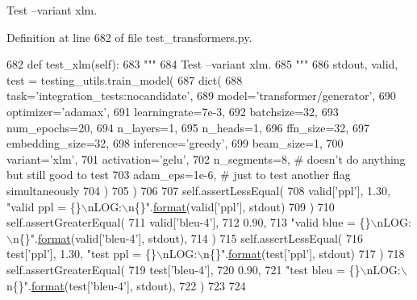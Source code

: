 \begin{DoxyVerb}Test --variant xlm.
\end{DoxyVerb}
 

Definition at line 682 of file test\+\_\+transformers.\+py.


\begin{DoxyCode}
682     \textcolor{keyword}{def }test\_xlm(self):
683         \textcolor{stringliteral}{"""}
684 \textcolor{stringliteral}{        Test --variant xlm.}
685 \textcolor{stringliteral}{        """}
686         stdout, valid, test = testing\_utils.train\_model(
687             dict(
688                 task=\textcolor{stringliteral}{'integration\_tests:nocandidate'},
689                 model=\textcolor{stringliteral}{'transformer/generator'},
690                 optimizer=\textcolor{stringliteral}{'adamax'},
691                 learningrate=7e-3,
692                 batchsize=32,
693                 num\_epochs=20,
694                 n\_layers=1,
695                 n\_heads=1,
696                 ffn\_size=32,
697                 embedding\_size=32,
698                 inference=\textcolor{stringliteral}{'greedy'},
699                 beam\_size=1,
700                 variant=\textcolor{stringliteral}{'xlm'},
701                 activation=\textcolor{stringliteral}{'gelu'},
702                 n\_segments=8,  \textcolor{comment}{# doesn't do anything but still good to test}
703                 adam\_eps=1e-6,  \textcolor{comment}{# just to test another flag simultaneously}
704             )
705         )
706 
707         self.assertLessEqual(
708             valid[\textcolor{stringliteral}{'ppl'}], 1.30, \textcolor{stringliteral}{"valid ppl = \{\}\(\backslash\)nLOG:\(\backslash\)n\{\}"}.\hyperlink{namespaceparlai_1_1chat__service_1_1services_1_1messenger_1_1shared__utils_a32e2e2022b824fbaf80c747160b52a76}{format}(valid[\textcolor{stringliteral}{'ppl'}], stdout)
709         )
710         self.assertGreaterEqual(
711             valid[\textcolor{stringliteral}{'bleu-4'}],
712             0.90,
713             \textcolor{stringliteral}{"valid blue = \{\}\(\backslash\)nLOG:\(\backslash\)n\{\}"}.\hyperlink{namespaceparlai_1_1chat__service_1_1services_1_1messenger_1_1shared__utils_a32e2e2022b824fbaf80c747160b52a76}{format}(valid[\textcolor{stringliteral}{'bleu-4'}], stdout),
714         )
715         self.assertLessEqual(
716             test[\textcolor{stringliteral}{'ppl'}], 1.30, \textcolor{stringliteral}{"test ppl = \{\}\(\backslash\)nLOG:\(\backslash\)n\{\}"}.\hyperlink{namespaceparlai_1_1chat__service_1_1services_1_1messenger_1_1shared__utils_a32e2e2022b824fbaf80c747160b52a76}{format}(test[\textcolor{stringliteral}{'ppl'}], stdout)
717         )
718         self.assertGreaterEqual(
719             test[\textcolor{stringliteral}{'bleu-4'}],
720             0.90,
721             \textcolor{stringliteral}{"test bleu = \{\}\(\backslash\)nLOG:\(\backslash\)n\{\}"}.\hyperlink{namespaceparlai_1_1chat__service_1_1services_1_1messenger_1_1shared__utils_a32e2e2022b824fbaf80c747160b52a76}{format}(test[\textcolor{stringliteral}{'bleu-4'}], stdout),
722         )
723 
724 
\end{DoxyCode}


